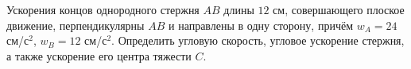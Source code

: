 Ускорения концов однородного стержня $AB$ длины $12$ см, совершающего
плоское движение, перпендикулярны $AB$ и направлены в одну сторону,
причём $w_A=24$ см/с$^2$, $w_B=12$ см/с$^2$. Определить угловую
скорость, угловое ускорение стержня, а также ускорение его центра
тяжести $C$.
